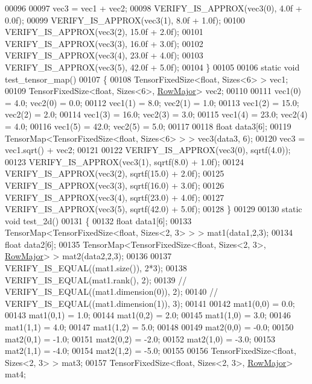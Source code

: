 \begin{DoxyCode}
00096 
00097   vec3 = vec1 + vec2;
00098   VERIFY\_IS\_APPROX(vec3(0), 4.0f + 0.0f);
00099   VERIFY\_IS\_APPROX(vec3(1), 8.0f + 1.0f);
00100   VERIFY\_IS\_APPROX(vec3(2), 15.0f + 2.0f);
00101   VERIFY\_IS\_APPROX(vec3(3), 16.0f + 3.0f);
00102   VERIFY\_IS\_APPROX(vec3(4), 23.0f + 4.0f);
00103   VERIFY\_IS\_APPROX(vec3(5), 42.0f + 5.0f);
00104 \}
00105 
00106 \textcolor{keyword}{static} \textcolor{keywordtype}{void} test\_tensor\_map()
00107 \{
00108   TensorFixedSize<float, Sizes<6> > vec1;
00109   TensorFixedSize<float, Sizes<6>, \hyperlink{group__enums_ggaacded1a18ae58b0f554751f6cdf9eb13acfcde9cd8677c5f7caf6bd603666aae3}{RowMajor}> vec2;
00110 
00111   vec1(0) = 4.0;  vec2(0) = 0.0;
00112   vec1(1) = 8.0;  vec2(1) = 1.0;
00113   vec1(2) = 15.0; vec2(2) = 2.0;
00114   vec1(3) = 16.0; vec2(3) = 3.0;
00115   vec1(4) = 23.0; vec2(4) = 4.0;
00116   vec1(5) = 42.0; vec2(5) = 5.0;
00117 
00118   \textcolor{keywordtype}{float} data3[6];
00119   TensorMap<TensorFixedSize<float, Sizes<6> > > vec3(data3, 6);
00120   vec3 = vec1.sqrt() + vec2;
00121 
00122   VERIFY\_IS\_APPROX(vec3(0), sqrtf(4.0));
00123   VERIFY\_IS\_APPROX(vec3(1), sqrtf(8.0) + 1.0f);
00124   VERIFY\_IS\_APPROX(vec3(2), sqrtf(15.0) + 2.0f);
00125   VERIFY\_IS\_APPROX(vec3(3), sqrtf(16.0) + 3.0f);
00126   VERIFY\_IS\_APPROX(vec3(4), sqrtf(23.0) + 4.0f);
00127   VERIFY\_IS\_APPROX(vec3(5), sqrtf(42.0) + 5.0f);
00128 \}
00129 
00130 \textcolor{keyword}{static} \textcolor{keywordtype}{void} test\_2d()
00131 \{
00132   \textcolor{keywordtype}{float} data1[6];
00133   TensorMap<TensorFixedSize<float, Sizes<2, 3> > > mat1(data1,2,3);
00134   \textcolor{keywordtype}{float} data2[6];
00135   TensorMap<TensorFixedSize<float, Sizes<2, 3>, \hyperlink{group__enums_ggaacded1a18ae58b0f554751f6cdf9eb13acfcde9cd8677c5f7caf6bd603666aae3}{RowMajor}> > mat2(data2,2,3);
00136 
00137   VERIFY\_IS\_EQUAL((mat1.size()), 2*3);
00138   VERIFY\_IS\_EQUAL(mat1.rank(), 2);
00139   \textcolor{comment}{//  VERIFY\_IS\_EQUAL((mat1.dimension(0)), 2);}
00140   \textcolor{comment}{//  VERIFY\_IS\_EQUAL((mat1.dimension(1)), 3);}
00141 
00142   mat1(0,0) = 0.0;
00143   mat1(0,1) = 1.0;
00144   mat1(0,2) = 2.0;
00145   mat1(1,0) = 3.0;
00146   mat1(1,1) = 4.0;
00147   mat1(1,2) = 5.0;
00148 
00149   mat2(0,0) = -0.0;
00150   mat2(0,1) = -1.0;
00151   mat2(0,2) = -2.0;
00152   mat2(1,0) = -3.0;
00153   mat2(1,1) = -4.0;
00154   mat2(1,2) = -5.0;
00155 
00156   TensorFixedSize<float, Sizes<2, 3> > mat3;
00157   TensorFixedSize<float, Sizes<2, 3>, \hyperlink{group__enums_ggaacded1a18ae58b0f554751f6cdf9eb13acfcde9cd8677c5f7caf6bd603666aae3}{RowMajor}> mat4;

\end{DoxyCode}
